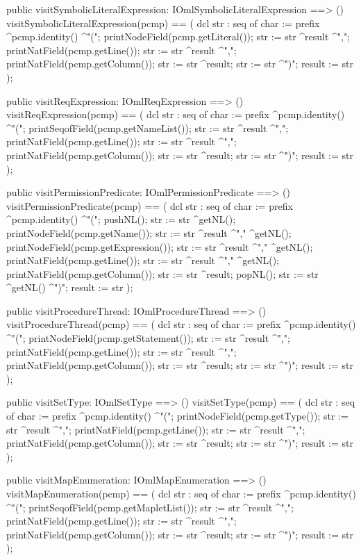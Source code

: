 \begin{vdm_al}
  public visitSymbolicLiteralExpression: IOmlSymbolicLiteralExpression ==> ()
  visitSymbolicLiteralExpression(pcmp) ==
    ( dcl str : seq of char := prefix ^pcmp.identity() ^"(";
      printNodeField(pcmp.getLiteral());
      str := str ^result ^",";
      printNatField(pcmp.getLine());
      str := str ^result ^",";
      printNatField(pcmp.getColumn());
      str := str ^result;
      str := str ^")";
      result := str );

  public visitReqExpression: IOmlReqExpression ==> ()
  visitReqExpression(pcmp) ==
    ( dcl str : seq of char := prefix ^pcmp.identity() ^"(";
      printSeqofField(pcmp.getNameList());
      str := str ^result ^",";
      printNatField(pcmp.getLine());
      str := str ^result ^",";
      printNatField(pcmp.getColumn());
      str := str ^result;
      str := str ^")";
      result := str );

  public visitPermissionPredicate: IOmlPermissionPredicate ==> ()
  visitPermissionPredicate(pcmp) ==
    ( dcl str : seq of char := prefix ^pcmp.identity() ^"(";
      pushNL();
      str := str ^getNL();
      printNodeField(pcmp.getName());
      str := str ^result ^"," ^getNL();
      printNodeField(pcmp.getExpression());
      str := str ^result ^"," ^getNL();
      printNatField(pcmp.getLine());
      str := str ^result ^"," ^getNL();
      printNatField(pcmp.getColumn());
      str := str ^result;
      popNL();
      str := str ^getNL() ^")";
      result := str );

  public visitProcedureThread: IOmlProcedureThread ==> ()
  visitProcedureThread(pcmp) ==
    ( dcl str : seq of char := prefix ^pcmp.identity() ^"(";
      printNodeField(pcmp.getStatement());
      str := str ^result ^",";
      printNatField(pcmp.getLine());
      str := str ^result ^",";
      printNatField(pcmp.getColumn());
      str := str ^result;
      str := str ^")";
      result := str );

  public visitSetType: IOmlSetType ==> ()
  visitSetType(pcmp) ==
    ( dcl str : seq of char := prefix ^pcmp.identity() ^"(";
      printNodeField(pcmp.getType());
      str := str ^result ^",";
      printNatField(pcmp.getLine());
      str := str ^result ^",";
      printNatField(pcmp.getColumn());
      str := str ^result;
      str := str ^")";
      result := str );

  public visitMapEnumeration: IOmlMapEnumeration ==> ()
  visitMapEnumeration(pcmp) ==
    ( dcl str : seq of char := prefix ^pcmp.identity() ^"(";
      printSeqofField(pcmp.getMapletList());
      str := str ^result ^",";
      printNatField(pcmp.getLine());
      str := str ^result ^",";
      printNatField(pcmp.getColumn());
      str := str ^result;
      str := str ^")";
      result := str );


\end{vdm_al}

